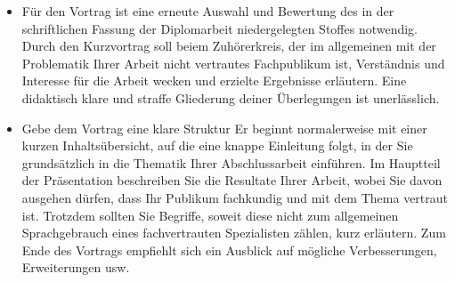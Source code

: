 \begin{itemize}
\item 
Für den Vortrag ist eine erneute Auswahl und Bewertung des in der schriftlichen Fassung der Diplomarbeit niedergelegten Stoffes notwendig. Durch den Kurzvortrag soll beiem Zuhörerkreis, der im allgemeinen mit der Problematik Ihrer Arbeit nicht vertrautes Fachpublikum ist, Verständnis und Interesse für die Arbeit wecken und erzielte Ergebnisse erläutern. Eine didaktisch klare und straffe Gliederung deiner Überlegungen ist unerlässlich. 

\item
Gebe dem Vortrag eine klare Struktur Er beginnt normalerweise mit einer kurzen Inhaltsübersicht, auf die eine knappe Einleitung folgt, in der Sie grundsätzlich in die Thematik Ihrer Abschlussarbeit einführen. Im Hauptteil der Präsentation beschreiben Sie die Resultate Ihrer Arbeit, wobei Sie davon ausgehen dürfen, dass Ihr Publikum fachkundig und mit dem Thema vertraut ist. Trotzdem sollten Sie Begriffe, soweit diese nicht zum allgemeinen Sprachgebrauch eines fachvertrauten Spezialisten zählen, kurz erläutern. Zum Ende des Vortrags empfiehlt sich ein Ausblick auf mögliche Verbesserungen, Erweiterungen usw.


\end{itemize}

